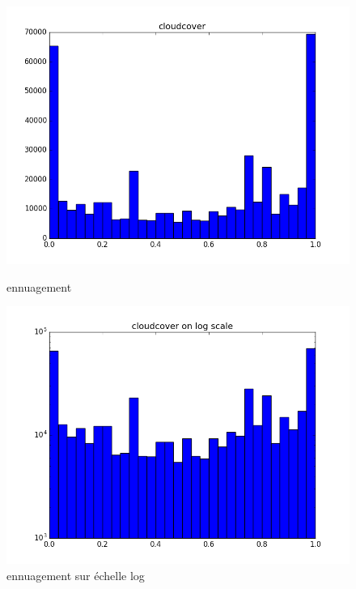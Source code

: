 \begin{figure}[H]
\captionsetup{labelformat=empty}
  \includegraphics[width=\linewidth]{images/ennuagement.png}
  \caption{ennuagement}
\endminipage\hfill
{}
  \includegraphics[width=\linewidth]{images/log_ennuagement.png}
  \caption{ennuagement sur échelle log}
\endminipage\hfill
\end{figure}


